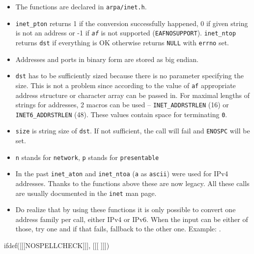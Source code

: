 \begin{itemize}
\item The functions are declared in \texttt{arpa/inet.h}.
\item \texttt{inet\_pton} returns 1 if the conversion successfully happened,
0 if given string is not an address or -1 if \emph{\texttt{af}} is not supported
(\texttt{EAFNOSUPPORT}). \texttt{inet\_ntop} returns \texttt{dst} if everything
is OK otherwise returns \texttt{NULL} with \texttt{errno} set.
\item Addresses and ports in binary form are stored as big endian.
\item \texttt{dst} has to be sufficiently sized because there is no parameter
specifying the size. This is not a problem since according to the value of
\texttt{af} appropriate address structure or character array can be passed in.
For maximal lengths of strings for addresses, 2 macros can be used --
\texttt{INET\_ADDRSTR\-LEN} (16) or \texttt{INET6\_ADDRSTRLEN} (48). 
These values contain space for terminating \texttt{\bs{}0}.
\item \texttt{size} is string size of \texttt{dst}. If not sufficient, the call
will fail and \texttt{ENOSPC} will be set.
\item \texttt{n} stands for \texttt{network}, \texttt{p} stands for
\texttt{presentable}
\item In the past \texttt{inet\_aton} and \texttt{inet\_ntoa} (\texttt{a} as
\texttt{ascii}) were used for IPv4 addresses. Thanks to the functions above
these are now legacy. All these calls are usually documented in the
\texttt{inet} man page.
\item {} Do realize that by using these functions it is only
possible to convert one address family per call, either IPv4 or IPv6.  When the
input can be either of those, try one and if that fails, fallback to the other
one.  Example: .
\end{itemize}


ifdef([[[NOSPELLCHECK]]], [[[
]]])

